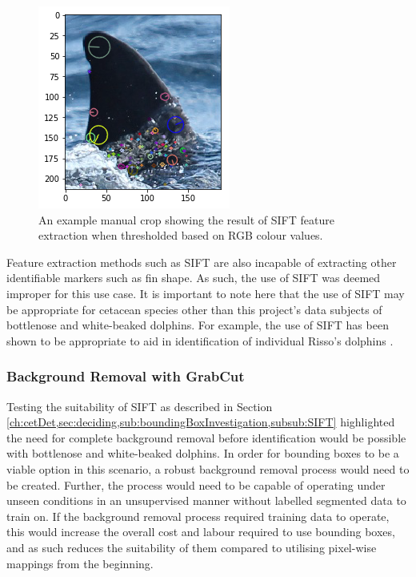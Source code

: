 \begin{figure}
	\begin{center}
		\includegraphics[scale=0.6]{Chapter3/figs/manual-crop-sift-colour-thresholding.png}
	\end{center}
	\caption{An example manual crop showing the result of SIFT feature extraction when thresholded based on RGB colour values.
	}
	\label{fig:manual-crop-sift-colour-thresholding-example}
\end{figure}

Feature extraction methods such as SIFT are also incapable of extracting other identifiable markers such as fin shape. As such, the use of SIFT was deemed improper for this use case. It is important to note here that the use of SIFT may be appropriate for cetacean species other than this project's data subjects of bottlenose and white-beaked dolphins. For example, the use of SIFT has been shown to be appropriate to aid in identification of individual Risso's dolphins \cite{reno_sift-based_2019}.

\subsubsection{Background Removal with GrabCut}\label{ch:cetDet,sec:deciding,sub:boundingBoxInvestigation,subsub:GrabCut}

Testing the suitability of SIFT as described in Section \ref{ch:cetDet,sec:deciding,sub:boundingBoxInvestigation,subsub:SIFT} highlighted the need for complete background removal before identification would be possible with bottlenose and white-beaked dolphins. In order for bounding boxes to be a viable option in this scenario, a robust background removal process would need to be created. Further, the process would need to be capable of operating under unseen conditions in an unsupervised manner without labelled segmented  data to train on. If the background removal process required training data to operate, this would increase the overall cost and labour required to use bounding boxes, and as such reduces the suitability of them compared to utilising pixel-wise mappings from the beginning. 

